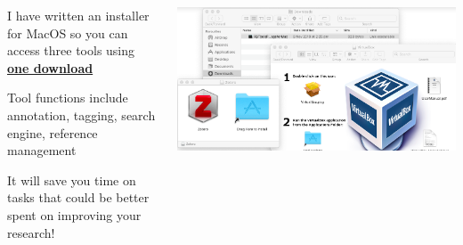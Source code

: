 \documentclass[unknownkeysallowed,usepdftitle=false, parskip=full, aspectratio=169]{beamer}
\newcommand{\secvariable}{nothing}
\begin{document}
\begin{frame}
{\begin{columns}[t]
\begin{column}[c]{0.5\textwidth}
 \vspace{12pt}


 
   \end{column}
  \end{columns}

}

   
\end{frame}

\begin{frame}\label{\secvariable}
    \parbox{\linewidth}{

\begin{columns}[t]
\begin{column}[c]{0.5\textwidth}
      
      I have written an installer for MacOS so you can access three tools using \href{https://github.com/MQ-FOAR705/Osmond-Chiu---Proof-of-Concept---Implementation.git}{\textbf{one download}}
 
      \vspace{12pt}
      
      Tool functions include annotation, tagging, search engine, reference management
      
      \vspace{12pt}
 
      It will save you time on tasks that could be better spent on improving your research!

 \end{column}
    \begin{column}[c]{0.5\textwidth}
\includegraphics[width=1\textwidth,height=0.5\textheight,keepaspectratio]{figure/macos.png}\\
   \end{column}
  \end{columns}
}
 
\end{frame}
\end{document}

